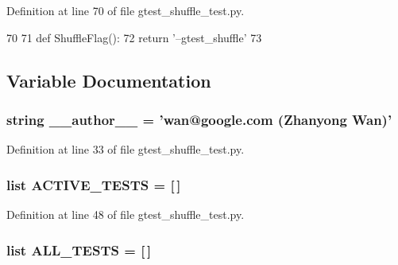 \-Definition at line 70 of file gtest\-\_\-shuffle\-\_\-test.\-py.


\begin{DoxyCode}
70 
71 def ShuffleFlag():
72   return '--gtest_shuffle'
73 

\end{DoxyCode}


\subsection{\-Variable \-Documentation}
\hypertarget{namespacegtest__shuffle__test_a629d61dfe4da763164a4d1a2d85b0afd}{
\subsubsection[{\-\_\-\-\_\-author\-\_\-\-\_\-}]{\setlength{\rightskip}{0pt plus 5cm}string {\bf \-\_\-\-\_\-author\-\_\-\-\_\-} = 'wan@google.\-com (\-Zhanyong \-Wan)'}}\label{d3/d15/namespacegtest__shuffle__test_a629d61dfe4da763164a4d1a2d85b0afd}


\-Definition at line 33 of file gtest\-\_\-shuffle\-\_\-test.\-py.

\hypertarget{namespacegtest__shuffle__test_a10a0fc6f90e8342edb66ea225cee9164}{
\subsubsection[{\-A\-C\-T\-I\-V\-E\-\_\-\-T\-E\-S\-T\-S}]{\setlength{\rightskip}{0pt plus 5cm}list {\bf \-A\-C\-T\-I\-V\-E\-\_\-\-T\-E\-S\-T\-S} = \mbox{[}$\,$\mbox{]}}}\label{d3/d15/namespacegtest__shuffle__test_a10a0fc6f90e8342edb66ea225cee9164}


\-Definition at line 48 of file gtest\-\_\-shuffle\-\_\-test.\-py.

\hypertarget{namespacegtest__shuffle__test_a18b8b804578036b31674b8f9bf24a29d}{
\subsubsection[{\-A\-L\-L\-\_\-\-T\-E\-S\-T\-S}]{\setlength{\rightskip}{0pt plus 5cm}list {\bf \-A\-L\-L\-\_\-\-T\-E\-S\-T\-S} = \mbox{[}$\,$\mbox{]}}}\label{d3/d15/namespacegtest__shuffle__test_a18b8b804578036b31674b8f9bf24a29d}


